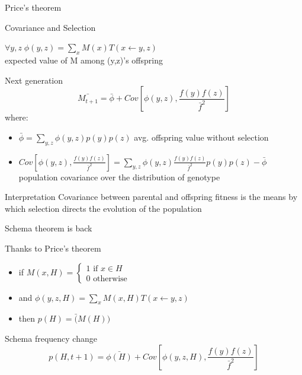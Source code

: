 \begin{frame}{Price's theorem}
  \begin{block}{Covariance and Selection}
    \begin{center}
      $\forall y,z \; \phi(y,z) = \sum\limits_{x} M(x)T(x \leftarrow y,z)$\\ expected value of M among (y,z)'s offspring
      \end{center}
  \end{block}

  \begin{block}{Next generation}
    $$\bar{M_{t+1}} = \bar{\phi}
    + Cov[\phi(y,z), \frac{f(y)f(z)}{\bar{f}^2}]$$
    where:
    \begin{itemize}
    \item $\bar{\phi} = \sum\limits_{y,z} \phi(y,z)p(y)p(z)$ avg. offspring value without selection
    \item $Cov[\phi(y,z), \frac{f(y)f(z)}{\bar{f}^2}] =
      \sum\limits_{y,z} \phi(y,z) \frac{f(y)f(z)}{\bar{f}^2}p(y)p(z) -
      \bar{\phi}$ population covariance over the distribution of genotype
    \end{itemize}
  \end{block}

  \begin{block}{Interpretation}
    Covariance between parental and offspring fitness is the means by which selection directs the evolution of the population
  \end{block}
\end{frame}

\begin{frame}{Schema theorem is back}
  \begin{block}{Thanks to Price's theorem}
    \begin{itemize}
      \item if $M(x, H) = \left\{\begin{array}{l}
        1 \text{ if } x \in H\\
        0 \text{ otherwise}
        \end{array}
        \right .$
      \item and $\phi(y,z,H) = \sum\limits_{x} M(x,H)T(x \leftarrow y,z)$
      \item then $p(H) = \bar(M(H))$
    \end{itemize}
  \end{block}

  \begin{block}{Schema frequency change\cite{Altenberg95}}
    $$p(H,t+1) = \bar{\phi(H)} + Cov[\phi(y,z,H), \frac{f(y)f(z)}{\bar{f}^2}]$$
  \end{block}

\end{frame}

